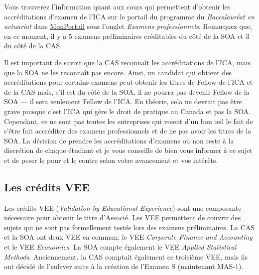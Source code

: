 Vous trouverez l'information quant aux cours qui permettent d'obtenir les accréditations d'examen de l'ICA sur le portail du programme du \textit{Baccalauréat en actuariat} dans \href{https://www.monportail.ulaval.ca}{MonPortail} sous l'onglet \textit{Examens professionnels}. Remarquez que, en ce moment, il y a 5 examens préliminaires créditables du côté de la SOA et 3 du côté de la CAS. \vspace{\baselineskip}

Il est important de savoir que la CAS reconnaît les accréditations de l'ICA, mais que la SOA ne les reconnaît pas encore. Ainsi, un candidat qui obtient des accréditations pour certains examens peut obtenir les titres de Fellow de l'ICA et de la CAS mais, s'il est du côté de la SOA, il ne pourra pas devenir Fellow de la SOA --- il sera seulement Fellow de l'ICA. En théorie, cela ne devrait pas être grave puisque c'est l'ICA qui gère le droit de pratique au Canada et pas la SOA. Cependant, ce ne sont pas toutes les entreprises qui voient d'un bon œil le fait de s'être fait accréditer des examens professionnels et de ne pas avoir les titres de la SOA. La décision de prendre les accréditations d'examens ou non reste à la discrétion de chaque étudiant et je vous conseille de bien vous informer à ce sujet et de peser le pour et le contre selon votre avancement et vos intérêts.

\newpage

\subsection*{Les crédits VEE}
\label{subsec:vee}
Les crédits VEE (\emph{Validation by Educational Experience}) sont une composante nécessaire pour obtenir le titre d'Associé. Les VEE permettent de couvrir des sujets qui ne sont pas formellement testés lors des examens préliminaires. La CAS et la SOA ont deux VEE en commun: le VEE \emph{Corporate Finance and Accounting} et le VEE \emph{Economics}. La SOA compte également le VEE \emph{Applied Statistical Methods}. Anciennement, la CAS comptait également ce troisième VEE, mais ils ont décidé de l'enlever suite à la création de l'Examen S (maintenant MAS-1).\vspace{\baselineskip}

